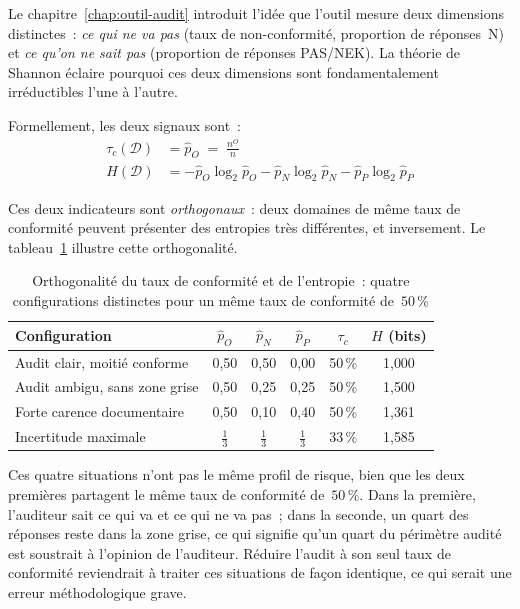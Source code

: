 Le chapitre~\ref{chap:outil-audit} introduit l'idée que l'outil mesure deux
dimensions distinctes~: \emph{ce qui ne va pas} (taux de non-conformité,
proportion de réponses~N) et \emph{ce qu'on ne sait pas} (proportion de réponses
PAS/NEK). La théorie de Shannon éclaire pourquoi ces deux dimensions sont
fondamentalement irréductibles l'une à l'autre.

Formellement, les deux signaux sont~:
\begin{align}
  \tau_c(\mathcal{D}) &= \hat{p}_O \;=\; \frac{n^O}{n}
  \label{eq:taux-conformite} \\[6pt]
  H(\mathcal{D}) &= -\hat{p}_O \log_2 \hat{p}_O
                   - \hat{p}_N \log_2 \hat{p}_N
                   - \hat{p}_P \log_2 \hat{p}_P
  \label{eq:entropie-domaine2}
\end{align}

Ces deux indicateurs sont \emph{orthogonaux}~: deux domaines de même taux de
conformité peuvent présenter des entropies très différentes, et inversement. Le
tableau~\ref{tab:ortho} illustre cette orthogonalité.

\begin{table}[H]
\centering
\small
\caption{Orthogonalité du taux de conformité et de l'entropie~: quatre
configurations distinctes pour un même taux de conformité de~$50\,\%$}
\label{tab:ortho}
\begin{tabular}{lccccc}
\toprule
\textbf{Configuration} & $\hat{p}_O$ & $\hat{p}_N$ & $\hat{p}_P$ &
$\tau_c$ & $H$ (bits) \\
\midrule
Audit clair, moitié conforme & 0{,}50 & 0{,}50 & 0{,}00 & 50\,\% & 1{,}000 \\
Audit ambigu, sans zone grise & 0{,}50 & 0{,}25 & 0{,}25 & 50\,\% & 1{,}500 \\
Forte carence documentaire & 0{,}50 & 0{,}10 & 0{,}40 & 50\,\% & 1{,}361 \\
Incertitude maximale & $\frac{1}{3}$ & $\frac{1}{3}$ & $\frac{1}{3}$ & 33\,\% & 1{,}585 \\
\bottomrule
\end{tabular}
\end{table}

Ces quatre situations n'ont pas le même profil de risque, bien que les deux
premières partagent le même taux de conformité de~$50\,\%$. Dans la première,
l'auditeur sait ce qui va et ce qui ne va pas~; dans la seconde, un quart des
réponses reste dans la zone grise, ce qui signifie qu'un quart du périmètre
audité est soustrait à l'opinion de l'auditeur. Réduire l'audit à son seul taux
de conformité reviendrait à traiter ces situations de façon identique, ce qui
serait une erreur méthodologique grave.


